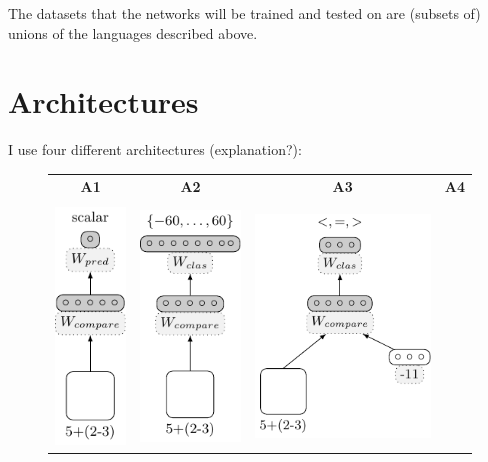 \documentclass{article}
\begin{document}
The datasets that the networks will be trained and tested on are (subsets of) unions of the languages described above.

\section{Architectures}

I use four different architectures (explanation?):

\begin{figure}[!ht]
\setlength{\tabcolsep}{18pt}
\begin{tabular}{|cccc|}
    \hline
    \textbf{A1} & \textbf{A2} & \textbf{A3} & \textbf{A4}\\
    & & &\\
    \includegraphics[scale=0.9]{A1} &
    \includegraphics[scale=0.9]{A2} &
    \includegraphics[scale=0.9]{A3} &

\end{tabular}
\end{figure}
\end{document}
